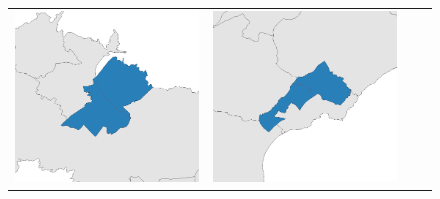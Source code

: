 \begin{figure}[p]
\begin{tabularx}{1\textwidth}{XXXX}
\includegraphics[width=1\linewidth]{images/ch6/mergefocus/03}&
\includegraphics[width=1\linewidth]{images/ch6/mergefocus/04} \\

\end{tabularx}
\end{figure}
